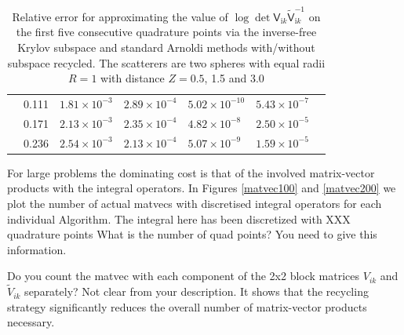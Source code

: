 \begin{table}[H]
\begin{tabular}{ |M{1.5cm}|M{1.7cm}|M{2.2cm} |M{2.2cm}|M{2.2cm}|M{3cm}|M{2.2cm}| }
                                   & 0.111    & $1.81\times 10^{-3}$  & $2.89\times 10^{-4}$  &$5.02\times 10^{-10}$ &$5.43\times 10^{-7}$\\ 
                                   & 0.171    & $2.13\times 10^{-3}$  & $2.35\times 10^{-4}$  &$4.82\times 10^{-8}$  &$2.50\times 10^{-5}$\\ 
                                   & 0.236    & $2.54\times 10^{-3}$  & $2.13\times 10^{-4}$  &$5.07\times 10^{-9}$  &$1.59\times 10^{-5}$\\ 
    \hline
    \end{tabular}
    \caption{Relative error for approximating the value of $\log\det\mathsf{V}_{\mathrm{i}k}\tilde{\mathsf{V}}_{\mathrm{i}k}^{-1}$ on the first five consecutive 
    quadrature points via the inverse-free Krylov subspace and standard Arnoldi methods with/without subspace recycled. The scatterers are two spheres with 
    equal radii $R = 1$ with distance $Z = 0.5$, 1.5 and 3.0}
    \label{Table lists the logdet}
    \end{table}
    
For large problems the dominating cost is that of the involved matrix-vector products with the integral operators. In Figures \ref{matvec100} and \ref{matvec200} we
plot the number of actual matvecs with discretised integral operators for each individual Algorithm. The integral here has been discretized with { XXX} quadrature
points {\color{red} What is the number of quad points? You need to give this information.}

 {\color{red} Do you count the matvec with each component of the
2x2 block matrices $V_{ik}$ and $\tilde{V}_{ik}$ separately? Not clear from your description.} It shows that the recycling strategy significantly reduces the overall number
of matrix-vector products necessary.

